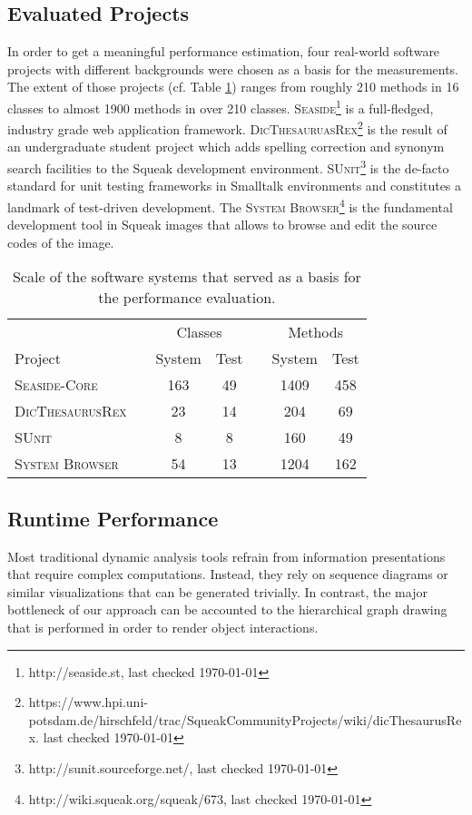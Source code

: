 \subsection{Evaluated Projects}
\label{ss:DiscussionProjects}
In order to get a meaningful performance estimation, four real-world software projects with different backgrounds were chosen as a basis for the measurements.
The extent of those projects (cf. Table \ref{t:EvaluationProjects}) ranges from roughly 210 methods in 16 classes to almost 1900 methods in over 210 classes.
\textsc{Seaside}\footnote{http://seaside.st, last checked \today} is a full-fledged, industry grade web application framework.
\textsc{DicThesauruasRex}\footnote{https://www.hpi.uni-potsdam.de/hirschfeld/trac/SqueakCommunityProjects/wiki/dicThesaurusRex. last checked \today} is the result of an undergraduate student project which adds spelling correction and synonym search facilities to the Squeak development environment.
\textsc{SUnit}\footnote{http://sunit.sourceforge.net/, last checked \today} is the de-facto standard for unit testing frameworks in Smalltalk environments and constitutes a landmark of test-driven development.
The \textsc{System Browser}\footnote{http://wiki.squeak.org/squeak/673, last checked \today} is the fundamental development tool in Squeak images that allows to browse and edit the source codes of the image.

\begin{table}
\centering
\begin{tabular}{lcccccc}
\toprule[1.5pt]
\phantom{abc} & \phantom{abc} & \multicolumn{2}{c}{Classes} & \phantom{abc} & \multicolumn{2}{c}{Methods}  \\
\cmidrule{3-4} \cmidrule{6-7}
Project    && System & Test && System & Test \\
\midrule
\textsc{Seaside-Core}		&&	163	&	49	&&	1409	&	458	\\
\textsc{DicThesaurusRex}	&&	23	&	14	&&	204		&	69	\\
\textsc{SUnit}				&&	8	&	8	&&	160		&	49	\\
\textsc{System Browser}		&&	54	&	13	&&	1204	&	162	\\
\bottomrule[1.5pt]
\end{tabular}
\caption[Test Subjects]{Scale of the software systems that served as a basis for the performance evaluation.}
\label{t:EvaluationProjects}
\end{table}

\subsection{Runtime Performance}
\label{ss:DiscussionPerformance}
Most traditional dynamic analysis tools refrain from information presentations that require complex computations.
Instead, they rely on sequence diagrams or similar visualizations that can be generated trivially.
In contrast, the major bottleneck of our approach can be accounted to the hierarchical graph drawing that is performed in order to render object interactions.

